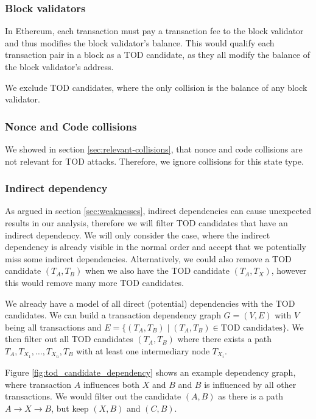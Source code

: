 \documentclass[draft,final]{vutinfth} %
\begin{document}
\subsubsection{Block validators}

In Ethereum, each transaction must pay a transaction fee to the block validator and thus modifies the block validator's balance. This would qualify each transaction pair in a block as a TOD candidate, as they all modify the balance of the block validator's address.

We exclude TOD candidates, where the only collision is the balance of any block validator.


\subsubsection{Nonce and Code collisions}

We showed in section \ref{sec:relevant-collisions}, that nonce and code collisions are not relevant for TOD attacks. Therefore, we ignore collisions for this state type.

\subsubsection{Indirect dependency}

As argued in section \ref{sec:weaknesses}, indirect dependencies can cause unexpected results in our analysis, therefore we will filter TOD candidates that have an indirect dependency. We will only consider the case, where the indirect dependency is already visible in the normal order and accept that we potentially miss some indirect dependencies. Alternatively, we could also remove a TOD candidate $(T_A, T_B)$ when we also have the TOD candidate $(T_A, T_X)$, however this would remove many more TOD candidates.

We already have a model of all direct (potential) dependencies with the TOD candidates. We can build a transaction dependency graph $G = (V, E)$ with $V$ being all transactions and $E = \{ (T_A, T_B) \mid (T_A, T_B) \in \text{TOD candidates} \}$. We then filter out all TOD candidates $(T_A, T_B)$ where there exists a path $T_A, T_{X_1}, \dots, T_{X_n}, T_B$ with at least one intermediary node $T_{X_i}$.

Figure \ref{fig:tod_candidate_dependency} shows an example dependency graph, where transaction $A$ influences both $X$ and $B$ and $B$ is influenced by all other transactions. We would filter out the candidate $(A, B)$ as there is a path $A \rightarrow X \rightarrow B$, but keep $(X, B)$ and $(C, B)$.
\end{document}

